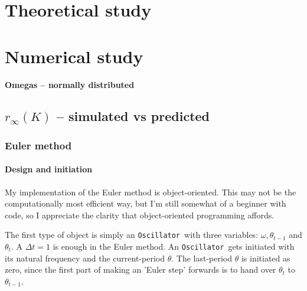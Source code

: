 \documentclass[10pt,a4paper]{article}
\newcommand{\osc}{\texttt{Oscillator}~}
\begin{document}
\section{Theoretical study}
















\section{Numerical study}


{\large\textbf{Omegas -- normally distributed}}
\subsection{$r_{\infty}(K)$ -- simulated vs predicted}


\subsubsection{Euler method}

\paragraph{Design and initiation}
My implementation of the Euler method is object-oriented. 
This may not be the computationally most efficient way, but I'm still somewhat of a beginner with code, so I appreciate the clarity that object-oriented programming affords.

The first type of object is simply an \osc with three variables: $\omega, \theta_{t-1}$ and $\theta_t$. 
A $\Delta t = 1$ is enough in the Euler method.
An \osc gets initiated with its natural frequency and the current-period $\theta$. 
The last-period $\theta$ is initiated as zero, since the first part of making an 'Euler step' forwards is to hand over $\theta_{t}$ to $\theta_{t-1}$. 
\end{document}
